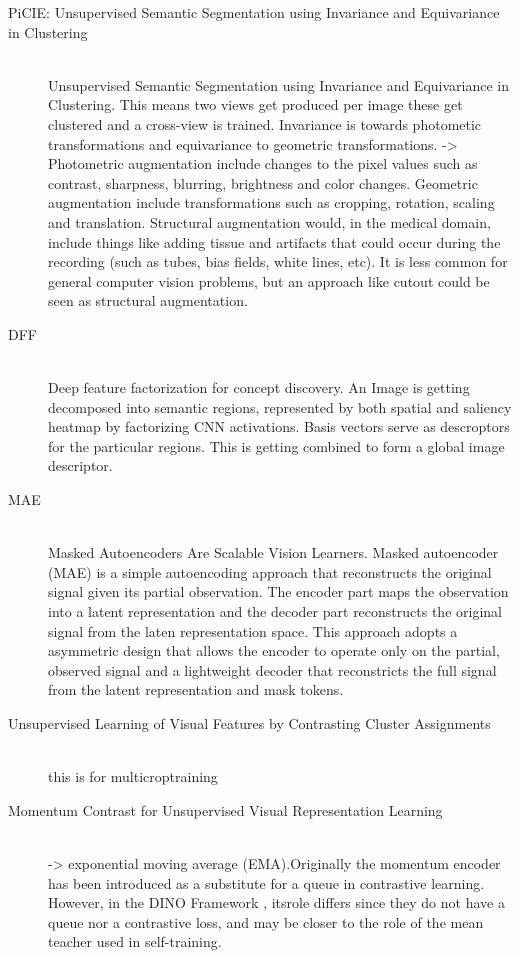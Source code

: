 \begin{description}
    \item[PiCIE: Unsupervised Semantic Segmentation using Invariance and Equivariance in Clustering] \hfill \\Unsupervised Semantic Segmentation using Invariance and Equivariance in Clustering. This means two views get produced per image these get clustered and a cross-view is trained. Invariance is towards photometic transformations and equivariance to geometric transformations. -> Photometric augmentation include changes to the pixel values such as contrast, sharpness, blurring, brightness and color changes. Geometric augmentation include transformations such as cropping, rotation, scaling and translation. Structural augmentation would, in the medical domain, include things like adding tissue and artifacts that could occur during the recording (such as tubes, bias fields, white lines, etc). It is less common for general computer vision problems, but an approach like cutout could be seen as structural augmentation. \cite{cho2021picie}
    \item [DFF] \hfill \\Deep feature factorization for concept discovery. An Image is getting decomposed into semantic regions, represented by both spatial and saliency heatmap by factorizing CNN activations. Basis vectors serve as descroptors for the particular regions. This is getting combined to form a global image descriptor.\cite{collins2018deep}
    \item [MAE] \hfill \\ Masked Autoencoders Are Scalable Vision Learners. Masked autoencoder (MAE) is a simple autoencoding approach that reconstructs the original signal given its partial observation. The encoder part maps the observation into a latent representation and the decoder part reconstructs the original signal from the laten representation space. This approach adopts a asymmetric design that allows the encoder to operate only on the partial, observed signal and a lightweight decoder that reconstricts the full signal from the latent representation and mask tokens. \cite{he2021masked}
    \item[Unsupervised Learning of Visual Features by Contrasting Cluster Assignments] \hfill \\this is for multicroptraining \cite{NEURIPS2020_70feb62b}
    \item[Momentum Contrast for Unsupervised Visual Representation Learning] \hfill\\ -> exponential moving average (EMA).Originally the momentum encoder has been introduced as a substitute for a queue in contrastive learning. However, in the DINO Framework \cite{caron2021emerging}, itsrole differs since they do not have a queue nor a contrastive loss, and may be closer to the role of the mean teacher used in self-training. \cite{he2020momentum} 

\end{description}

